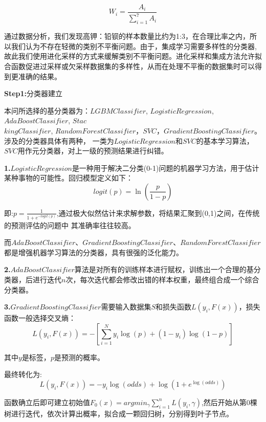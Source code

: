 \documentclass[UTF8]{ctexart}
\begin{document}
\begin{equation}
	W_i = \frac{A_i}{\sum_{i=1}^7 A_i}
\end{equation}

通过数据分析，我们发现高钾：铅钡的样本数量比约为1:3，在合理比率之内，所以我们认为不存在轻微的类别不平衡问题。由于，集成学习需要多样性的分类器,故此我们使用进化采样的方式来缓解类别不平衡问题。进化采样和集成方法允许拟合函数促进过采样或欠采样数据集的多样性，从而在处理不平衡的数据集时可以得到更准确的结果。

\textbf{Step1:}分类器建立

本问所选择的基分类器为：$LGBMClassifier$, $LogisticRegression$, $AdaBoostClassifier$, $Stac$  \\
$kingClassifier$, $RandomForestClassifier$，$SVC$，$GradientBoostingClassifier$。涉及的分类器具体有两种，
一类为$LogisticRegression$和$SVC$的基本学习算法，$SVC$用作元分类器，对上一级的预测结果进行纠错。

\textbf{1.}$LogisticRegression$是一种用于解决二分类(0-1)问题的机器学习方法，用于估计某种事物的可能性。回归模型定义如下：
\begin{equation}
	logit (p) = \ln (\frac{p}{1-p})
\end{equation}

即:$p = \frac{1}{1+e^{-logit (p)}}$,通过极大似然估计来求解参数，将结果汇聚到(0,1)之间，在传统的预测评估的问题中
其准确率往往较高。

而$AdaBoostClassifier$、$GradientBoostingClassifier$、$RandomForestClassifier$都是增强机器学习算法的分类器，具有很强的泛化能力。

\textbf{2.}$AdaBoostClassifier$算法是对所有的训练样本进行赋权，训练出一个合理的基分类器，后进行迭代$n$次，每次迭代都会修改出错的样本权重，最终组合成一个综合分类器。

\textbf{3.}$GradientBoostingClassifier$需要输入数据集$S$和损失函数$L(y_i,F(x))$，损失函数一般选择交叉熵：
\begin{equation}
	L(y_i,F(x)) = -[\sum_{i=1}^N y_i \log (p)+(1-y_i) \log (1-p)]
\end{equation}

其中$y$是标签，$p$是预测的概率。

最终转化为:
\begin{equation}
	L(y_i,F(x)) = -y_i \log (odds)+\log (1+e^{\log (odds)})
\end{equation}


函数确立后即可建立初始值$F_0(x) = argmin_\gamma \sum _{i=1}^n L(y_i,\gamma)$,然后开始从第0棵树进行迭代，依次计算出概率，拟合成一颗回归树，分别得到叶子节点。
\end{document}
